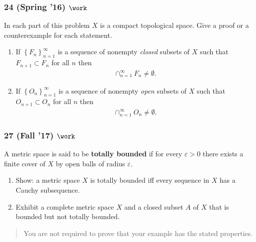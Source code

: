 \hypertarget{spring-16-work}{%
\subsubsection{\texorpdfstring{24 (Spring '16)
\(\work\)}{24 (Spring '16) \textbackslash work}}\label{spring-16-work}}

\begin{problem}[?]

In each part of this problem \(X\) is a compact topological space. Give
a proof or a counterexample for each statement.

\begin{enumerate}
\def\labelenumi{\alph{enumi}.}
\item
  If \(\left\{{F_n }\right\}_{n=1}^\infty\) is a sequence of nonempty
  \emph{closed} subsets of \(X\) such that \(F_{n+1} \subset F_{n}\) for
  all \(n\) then
  \begin{align*}\cap^\infty_{n=1} F_n\neq \emptyset.\end{align*}
\item
  If \(\left\{{O_n}\right\}_{n=1}^\infty\) is a sequence of nonempty
  \emph{open} subsets of \(X\) such that \(O_{n+1} \subset O_n\) for all
  \(n\) then
  \begin{align*}\cap_{n=1}^\infty O_{n}\neq \emptyset.\end{align*}
\end{enumerate}

\end{problem}

\hypertarget{fall-17-work-1}{%
\subsubsection{\texorpdfstring{27 (Fall '17)
\(\work\)}{27 (Fall '17) \textbackslash work}}\label{fall-17-work-1}}

\begin{problem}[?]

A metric space is said to be \textbf{totally bounded} if for every
\(\varepsilon> 0\) there exists a finite cover of \(X\) by open balls of
radius \(\varepsilon\).

\begin{enumerate}
\def\labelenumi{\alph{enumi}.}
\item
  Show: a metric space \(X\) is totally bounded iff every sequence in
  \(X\) has a Cauchy subsequence.
\item
  Exhibit a complete metric space \(X\) and a closed subset \(A\) of
  \(X\) that is bounded but not totally bounded.
\end{enumerate}

\begin{quote}
You are not required to prove that your example has the stated
properties.
\end{quote}

\end{problem}

